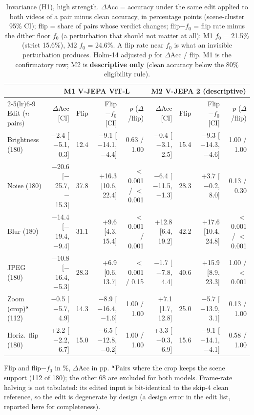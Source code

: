 \begin{table}[t]
\caption{Invariance (H1), high strength. $\Delta$Acc = accuracy under the same edit applied to both videos of a pair minus clean accuracy, in percentage points (scene-cluster 95\% CI); flip = share of pairs whose verdict changes; flip$-f_0$ = flip rate minus the dither floor $f_0$ (a perturbation that should not matter at all): M1 $f_0$ = 21.5\% (strict 15.6\%), M2 $f_0$ = 24.6\%. A flip rate near $f_0$ is what an invisible perturbation produces. Holm-14 adjusted $p$ for $\Delta$Acc / flip. M1 is the confirmatory row; M2 is \textbf{descriptive only} (clean accuracy below the 80\% eligibility rule).}
\label{tab:t2}
\centering\scriptsize
\setlength{\tabcolsep}{1.9pt}
\begin{tabular}{@{}lrrrrrrrr@{}}
\toprule
 & \multicolumn{4}{c}{M1 V-JEPA ViT-L} & \multicolumn{4}{c}{M2 V-JEPA 2 (descriptive)} \\
\cmidrule(lr){2-5}\cmidrule(lr){6-9}
Edit ($n$ pairs) & $\Delta$Acc [CI] & Flip & Flip$-f_0$ [CI] & $p$ ($\Delta$/flip) & $\Delta$Acc [CI] & Flip & Flip$-f_0$ [CI] & $p$ ($\Delta$/flip) \\
\midrule
Brightness (180) & $-$2.4 [$-$5.1, 0.3] & 12.4 & $-$9.1 [$-$14.1, $-$4.4] & 0.63 / 1.00 & $-$0.4 [$-$3.1, 2.5] & 15.4 & $-$9.3 [$-$14.3, $-$4.6] & 1.00 / 1.00 \\
Noise (180) & $-$20.6 [$-$25.7, $-$15.3] & 37.8 & +16.3 [10.6, 22.4] & $<$0.001 / $<$0.001 & $-$6.4 [$-$11.5, $-$1.3] & 28.3 & +3.7 [$-$0.2, 8.0] & 0.13 / 0.30 \\
Blur (180) & $-$14.4 [$-$19.4, $-$9.4] & 31.1 & +9.6 [4.3, 15.4] & $<$0.001 / 0.001 & +12.8 [6.4, 19.2] & 42.2 & +17.6 [10.4, 24.8] & $<$0.001 / $<$0.001 \\
JPEG (180) & $-$10.8 [$-$16.4, $-$5.3] & 28.3 & +6.9 [0.6, 13.7] & $<$0.001 / 0.15 & $-$1.7 [$-$7.8, 4.4] & 40.6 & +15.9 [8.9, 23.3] & 1.00 / $<$0.001 \\
Zoom (crop)$^{\rm a}$ (112) & $-$0.5 [$-$5.7, 4.9] & 14.3 & $-$8.9 [$-$16.4, $-$1.6] & 1.00 / 1.00 & +7.1 [1.7, 12.8] & 25.0 & $-$5.7 [$-$13.9, 3.1] & 0.13 / 1.00 \\
Horiz.\ flip (180) & +2.2 [$-$2.2, 6.7] & 15.0 & $-$6.5 [$-$12.8, $-$0.2] & 1.00 / 1.00 & +3.3 [$-$0.3, 6.9] & 15.6 & $-$9.1 [$-$14.1, $-$4.1] & 0.58 / 1.00 \\
\bottomrule
\end{tabular}

\vspace{2pt}
\raggedright\scriptsize Flip and flip$-f_0$ in \%, $\Delta$Acc in pp. $^{\rm a}$Pairs where the crop keeps the scene support (112 of 180); the other 68 are excluded for both models. Frame-rate halving is not tabulated: its edited input is bit-identical to the skip-4 clean reference, so the edit is degenerate by design (a design error in the edit list, reported here for completeness).
\end{table}
